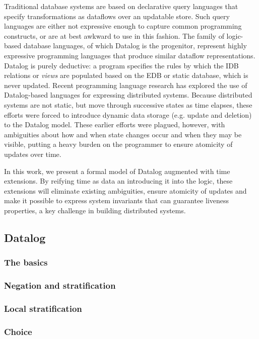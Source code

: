 \documentclass{acm_proc_article-sp-sigmod09}
\begin{document}
Traditional database systems are based on declarative query languages that specify transformations as dataflows over an updatable store.
Such query languages are either not expressive enough to capture common programming constructs, or are at best awkward to
use in this fashion.  The family of logic-based database languages, of which Datalog is the progenitor, represent highly
expressive programming languages that produce similar dataflow representations.  Datalog is purely deductive: a program specifies the rules
by which the IDB relations or \emph{views} are populated based on the EDB or static database, which is never updated.
Recent programming language research has explored the use of Datalog-based languages for expressing distributed systems.  Because distributed
systems are not static, but move through successive states as time elapses, these efforts were forced to introduce dynamic data storage (e.g. update and
deletion) to the Datalog model.  These earlier efforts were plagued, however, with ambiguities about how and when state changes occur and when 
they may be visible, putting a heavy burden on the programmer to ensure atomicity of updates over time.

In this work, we present a formal model of Datalog augmented with time extensions.  By reifying time as data an introducing it into the logic, these 
extensions will eliminate existing ambiguities, ensure atomicity of updates and make it possible to express system invariants that 
can guarantee liveness properties, a key challenge in building distributed systems.


\subsection{Datalog}

\subsubsection{The basics}  

\subsubsection{Negation and stratification}

\subsubsection{Local stratification}

\subsubsection{Choice}
\end{document}
